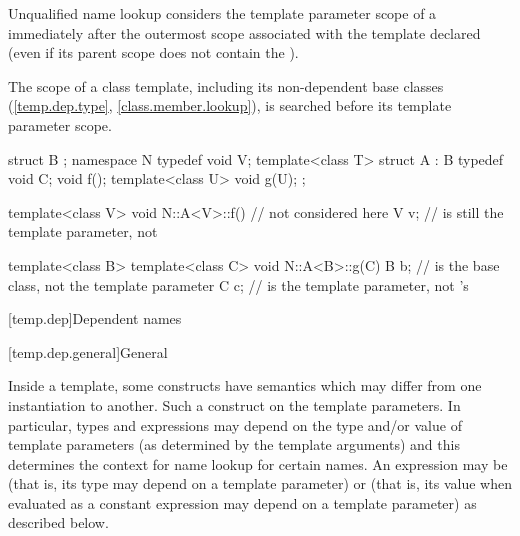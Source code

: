 \pnum
Unqualified name lookup considers
the template parameter scope of a 
immediately after the outermost scope associated with the template declared
(even if its parent scope does not contain
the ).
\begin{note}
The scope of a class template,
including its non-dependent base classes
(\ref{temp.dep.type}, \ref{class.member.lookup}),
is searched before its template parameter scope.
\end{note}
\begin{example}
\begin{codeblock}
struct B { };
namespace N {
  typedef void V;
  template<class T> struct A : B {
    typedef void C;
    void f();
    template<class U> void g(U);
  };
}

template<class V> void N::A<V>::f() {   //  not considered here
  V v;                                  //  is still the template parameter, not 
}

template<class B> template<class C> void N::A<B>::g(C) {
  B b;                                  //  is the base class, not the template parameter
  C c;                                  //  is the template parameter, not 's 
}
\end{codeblock}
\end{example}

[temp.dep]{Dependent names}

[temp.dep.general]{General}

\pnum
{}%
Inside a template, some constructs have semantics which may differ from one
instantiation to another.
Such a construct
on the template parameters.
In particular, types and expressions may depend on the type
and/or
value of
template parameters (as determined by the template arguments) and this determines
the context for name lookup for certain names.
An expression may be
(that is, its type may depend on a template parameter) or
(that is, its value when evaluated as a constant expression
may depend on a template parameter)
as described below.

